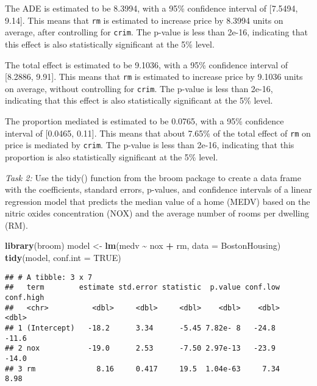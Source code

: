 \documentclass[
]{book}
\newenvironment{Shaded}{\begin{snugshade}}{\end{snugshade}}
\newcommand{\AttributeTok}[1]{\textcolor[rgb]{0.13,0.29,0.53}{#1}}
\newcommand{\ConstantTok}[1]{\textcolor[rgb]{0.56,0.35,0.01}{#1}}
\newcommand{\FunctionTok}[1]{\textcolor[rgb]{0.13,0.29,0.53}{\textbf{#1}}}
\newcommand{\NormalTok}[1]{#1}
\newcommand{\OtherTok}[1]{\textcolor[rgb]{0.56,0.35,0.01}{#1}}
\newcommand{\SpecialCharTok}[1]{\textcolor[rgb]{0.81,0.36,0.00}{\textbf{#1}}}
\begin{document}
The ADE is estimated to be 8.3994, with a 95\% confidence interval of {[}7.5494, 9.14{]}. This means that \texttt{rm} is estimated to increase price by 8.3994 units on average, after controlling for \texttt{crim}. The p-value is less than 2e-16, indicating that this effect is also statistically significant at the 5\% level.

The total effect is estimated to be 9.1036, with a 95\% confidence interval of {[}8.2886, 9.91{]}. This means that \texttt{rm} is estimated to increase price by 9.1036 units on average, without controlling for \texttt{crim}. The p-value is less than 2e-16, indicating that this effect is also statistically significant at the 5\% level.

The proportion mediated is estimated to be 0.0765, with a 95\% confidence interval of {[}0.0465, 0.11{]}. This means that about 7.65\% of the total effect of \texttt{rm} on price is mediated by \texttt{crim}. The p-value is less than 2e-16, indicating that this proportion is also statistically significant at the 5\% level.

\emph{Task 2:} Use the tidy() function from the broom package to create a data frame with the coefficients, standard errors, p-values, and confidence intervals of a linear regression model that predicts the median value of a home (MEDV) based on the nitric oxides concentration (NOX) and the average number of rooms per dwelling (RM).

\begin{Shaded}
\begin{Highlighting}[]
\FunctionTok{library}\NormalTok{(broom)}
\NormalTok{model }\OtherTok{\textless{}{-}} \FunctionTok{lm}\NormalTok{(medv }\SpecialCharTok{\textasciitilde{}}\NormalTok{ nox }\SpecialCharTok{+}\NormalTok{ rm, }\AttributeTok{data =}\NormalTok{ BostonHousing)}
\FunctionTok{tidy}\NormalTok{(model, }\AttributeTok{conf.int =} \ConstantTok{TRUE}\NormalTok{)}
\end{Highlighting}
\end{Shaded}

\begin{verbatim}
## # A tibble: 3 x 7
##   term        estimate std.error statistic  p.value conf.low conf.high
##   <chr>          <dbl>     <dbl>     <dbl>    <dbl>    <dbl>     <dbl>
## 1 (Intercept)   -18.2      3.34      -5.45 7.82e- 8   -24.8     -11.6 
## 2 nox           -19.0      2.53      -7.50 2.97e-13   -23.9     -14.0 
## 3 rm              8.16     0.417     19.5  1.04e-63     7.34      8.98
\end{verbatim}
\end{document}
